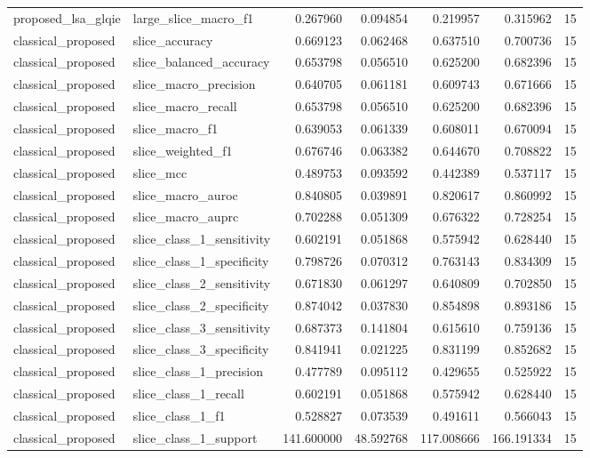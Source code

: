 \begin{tabular}{llrrrrr}
proposed_lsa_glqie & large_slice_macro_f1 & 0.267960 & 0.094854 & 0.219957 & 0.315962 & 15 \\
classical_proposed & slice_accuracy & 0.669123 & 0.062468 & 0.637510 & 0.700736 & 15 \\
classical_proposed & slice_balanced_accuracy & 0.653798 & 0.056510 & 0.625200 & 0.682396 & 15 \\
classical_proposed & slice_macro_precision & 0.640705 & 0.061181 & 0.609743 & 0.671666 & 15 \\
classical_proposed & slice_macro_recall & 0.653798 & 0.056510 & 0.625200 & 0.682396 & 15 \\
classical_proposed & slice_macro_f1 & 0.639053 & 0.061339 & 0.608011 & 0.670094 & 15 \\
classical_proposed & slice_weighted_f1 & 0.676746 & 0.063382 & 0.644670 & 0.708822 & 15 \\
classical_proposed & slice_mcc & 0.489753 & 0.093592 & 0.442389 & 0.537117 & 15 \\
classical_proposed & slice_macro_auroc & 0.840805 & 0.039891 & 0.820617 & 0.860992 & 15 \\
classical_proposed & slice_macro_auprc & 0.702288 & 0.051309 & 0.676322 & 0.728254 & 15 \\
classical_proposed & slice_class_1_sensitivity & 0.602191 & 0.051868 & 0.575942 & 0.628440 & 15 \\
classical_proposed & slice_class_1_specificity & 0.798726 & 0.070312 & 0.763143 & 0.834309 & 15 \\
classical_proposed & slice_class_2_sensitivity & 0.671830 & 0.061297 & 0.640809 & 0.702850 & 15 \\
classical_proposed & slice_class_2_specificity & 0.874042 & 0.037830 & 0.854898 & 0.893186 & 15 \\
classical_proposed & slice_class_3_sensitivity & 0.687373 & 0.141804 & 0.615610 & 0.759136 & 15 \\
classical_proposed & slice_class_3_specificity & 0.841941 & 0.021225 & 0.831199 & 0.852682 & 15 \\
classical_proposed & slice_class_1_precision & 0.477789 & 0.095112 & 0.429655 & 0.525922 & 15 \\
classical_proposed & slice_class_1_recall & 0.602191 & 0.051868 & 0.575942 & 0.628440 & 15 \\
classical_proposed & slice_class_1_f1 & 0.528827 & 0.073539 & 0.491611 & 0.566043 & 15 \\
classical_proposed & slice_class_1_support & 141.600000 & 48.592768 & 117.008666 & 166.191334 & 15 \\

\end{tabular}

